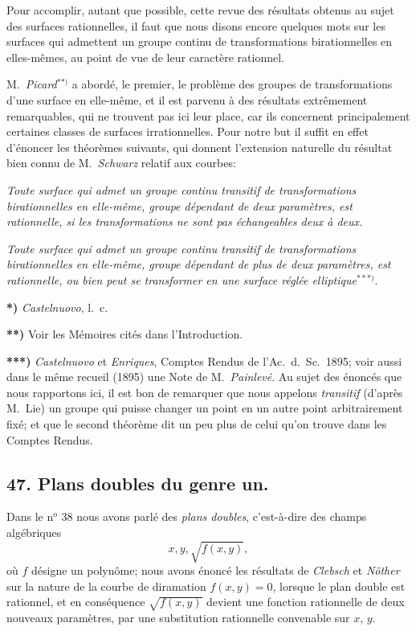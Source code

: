 \documentclass{article}
\begin{document}
Pour accomplir, autant que possible, cette revue des résultats obtenus au sujet des surfaces rationnelles, il faut que nous disons encore quelques mots sur les surfaces qui admettent un groupe continu de transformations birationnelles en elles-mêmes, au point de vue de leur caractère rationnel.

M.\ \emph{Picard}${}^{**)}$ a abordé, le premier, le problème des groupes de transformations d'une surface en elle-même, et il est parvenu à des résultats extrêmement remarquables, qui ne trouvent pas ici leur place, car ils concernent principalement certaines classes de surfaces irrationnelles. Pour notre but il suffit en effet d'énoncer les théorèmes suivants, qui donnent l'extension naturelle du résultat bien connu de M.\ \emph{Schwarz} relatif aux courbes:

\emph{Toute surface qui admet un groupe continu transitif de transformations birationnelles en elle-même, groupe dépendant de deux paramètres, est rationnelle, si les transformations ne sont pas échangeables deux à deux.}

\emph{Toute surface qui admet un groupe continu transitif de transformations birationnelles en elle-même, groupe dépendant de plus de deux paramètres, est rationnelle, ou bien peut se transformer en une surface réglée elliptique}${}^{***)}$.

\textbf{*)} \emph{Castelnuovo}, l.\ c.

\textbf{**)} Voir les Mémoires cités dans l'Introduction.

\textbf{***)} \emph{Castelnuovo} et \emph{Enriques}, Comptes Rendus de l'Ac.\ d.\ Sc.\ 1895; voir aussi dans le même recueil (1895) une Note de M.\ \emph{Painlevé}. Au sujet des énoncés que nous rapportons ici, il est bon de remarquer que nous appelons \emph{transitif} (d'après M.\ Lie) un groupe qui puisse changer un point en un autre point arbitrairement fixé; et que le second théorème dit un peu plus de celui qu'on trouve dans les Comptes Rendus.


\subsection*{47. Plans doubles du genre un.}

Dans le n${}^{\text{o}}$ 38 nous avons parlé des \emph{plans doubles}, c'est-à-dire des champs algébriques
\[ x, y, \sqrt{f(x, y)}, \]
où $f$ désigne un polynôme; nous avons énoncé les résultats de \emph{Clebsch} et \emph{Nöther} sur la nature de la courbe de diramation $f(x, y) = 0$, lorsque le plan double est rationnel, et en conséquence $\sqrt{f(x, y)}$ devient une fonction rationnelle de deux nouveaux paramètres, par une substitution rationnelle convenable sur $x$, $y$.
\end{document}
